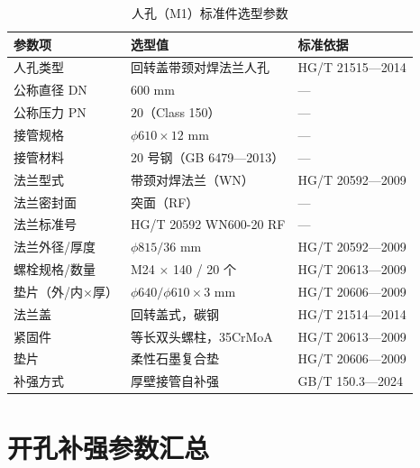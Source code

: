 \begin{table}[htbp]
  \centering
  \caption{人孔（M1）标准件选型参数}
  \label{tab:cad-manhole-detail}
  \small\renewcommand{\arraystretch}{1.2}
  \setlength{\tabcolsep}{8pt}
  \begin{tabularx}{\textwidth}{@{}l l l @{}}
    \toprule
    \textbf{参数项} & \textbf{选型值} & \textbf{标准依据} \\
    \midrule
    人孔类型                & 回转盖带颈对焊法兰人孔     & HG/T 21515—2014 \\
    公称直径 DN             & $600$ mm                    & — \\
    公称压力 PN             & $20$（Class 150）           & — \\
    接管规格                & $\phi 610 \times 12$ mm     & — \\
    接管材料                & 20 号钢（GB 6479—2013）   & — \\
    法兰型式                & 带颈对焊法兰（WN）          & HG/T 20592—2009 \\
    法兰密封面              & 突面（RF）                  & — \\
    法兰标准号              & HG/T 20592 WN600-20 RF     & — \\
    法兰外径/厚度           & $\phi 815/36$ mm            & HG/T 20592—2009 \\
    螺栓规格/数量           & M24 $\times$ 140 / 20 个    & HG/T 20613—2009 \\
    垫片（外/内$\times$厚） & $\phi 640/\phi 610 \times 3$ mm & HG/T 20606—2009 \\
    法兰盖                  & 回转盖式，碳钢              & HG/T 21514—2014 \\
    紧固件                  & 等长双头螺柱，35CrMoA       & HG/T 20613—2009 \\
    垫片                    & 柔性石墨复合垫              & HG/T 20606—2009 \\
    补强方式                & 厚壁接管自补强              & GB/T 150.3—2024 \\
    \bottomrule
  \end{tabularx}
\end{table}

\section{开孔补强参数汇总}
\label{sec:cad-reinforcement}

